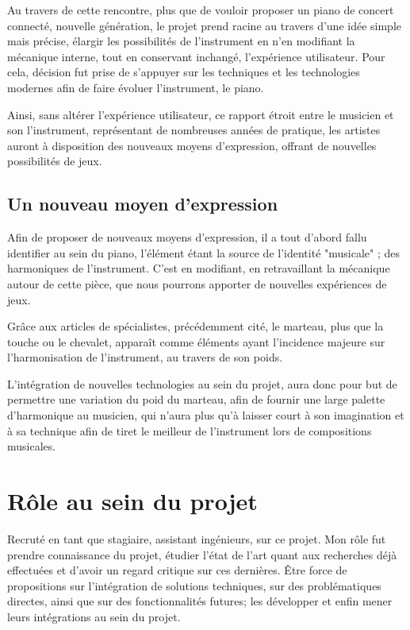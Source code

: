 \documentclass[french,a4paper,12pt]{report}
\begin{document}
	Au travers de cette rencontre, plus que de vouloir proposer un piano de concert connecté, nouvelle génération, le projet prend racine au travers d'une idée simple mais précise, élargir les possibilités de l'instrument en n'en modifiant la mécanique interne, tout en conservant inchangé, l'expérience utilisateur.
	Pour cela, décision fut prise de s'appuyer sur les techniques et les technologies modernes afin de faire évoluer l'instrument, le piano.
	
	Ainsi, sans altérer l'expérience utilisateur, ce rapport étroit entre le musicien et son l'instrument, représentant de nombreuses années de pratique, les artistes auront à disposition des nouveaux moyens d'expression, offrant de nouvelles possibilités de jeux.
	
	\newpage
	
		\subsection{Un nouveau moyen d'expression}
		
		Afin de proposer de nouveaux moyens d'expression, il a tout d'abord fallu identifier au sein du piano, l'élément étant la source de l'identité "musicale" ; des harmoniques de l'instrument. C'est en modifiant, en retravaillant la mécanique autour de cette pièce, que nous pourrons apporter de nouvelles expériences de jeux.
		
		Grâce aux articles de spécialistes, précédemment cité, le marteau, plus que la touche ou le chevalet, apparaît comme éléments ayant l'incidence majeure sur l'harmonisation de l'instrument, au travers de son poids.
		
		L'intégration de nouvelles technologies au sein du projet, aura donc pour but de permettre une variation du poid du marteau, afin de fournir une large palette d'harmonique au musicien, qui n'aura plus qu'à laisser court à son imagination et à sa technique afin de tiret le meilleur de l'instrument lors de compositions musicales.
	
	\section{Rôle au sein du projet}	
	
	Recruté en tant que stagiaire, assistant ingénieurs, sur ce projet. Mon rôle fut prendre connaissance du projet, étudier l'état de l'art quant aux recherches déjà effectuées et d'avoir un regard critique sur ces dernières. Être force de propositions sur l'intégration de solutions techniques, sur des problématiques directes, ainsi que sur des fonctionnalités futures; les développer et enfin mener leurs intégrations au sein du projet.
	
\end{document}
